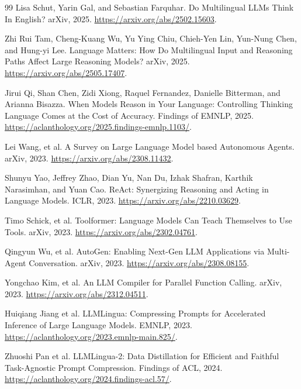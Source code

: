 \documentclass[11pt]{article}
\begin{document}
\begin{thebibliography}{99}
Lisa Schut, Yarin Gal, and Sebastian Farquhar.
\newblock Do Multilingual LLMs Think In English?
\newblock arXiv, 2025.
\newblock \url{https://arxiv.org/abs/2502.15603}.

Zhi Rui Tam, Cheng-Kuang Wu, Yu Ying Chiu, Chieh-Yen Lin, Yun-Nung Chen, and Hung-yi Lee.
\newblock Language Matters: How Do Multilingual Input and Reasoning Paths Affect Large Reasoning Models?
\newblock arXiv, 2025.
\newblock \url{https://arxiv.org/abs/2505.17407}.

Jirui Qi, Shan Chen, Zidi Xiong, Raquel Fernandez, Danielle Bitterman, and Arianna Bisazza.
\newblock When Models Reason in Your Language: Controlling Thinking Language Comes at the Cost of Accuracy.
\newblock Findings of EMNLP, 2025.
\newblock \url{https://aclanthology.org/2025.findings-emnlp.1103/}.

Lei Wang, et al.
\newblock A Survey on Large Language Model based Autonomous Agents.
\newblock arXiv, 2023.
\newblock \url{https://arxiv.org/abs/2308.11432}.

Shunyu Yao, Jeffrey Zhao, Dian Yu, Nan Du, Izhak Shafran, Karthik Narasimhan, and Yuan Cao.
\newblock ReAct: Synergizing Reasoning and Acting in Language Models.
\newblock ICLR, 2023.
\newblock \url{https://arxiv.org/abs/2210.03629}.

Timo Schick, et al.
\newblock Toolformer: Language Models Can Teach Themselves to Use Tools.
\newblock arXiv, 2023.
\newblock \url{https://arxiv.org/abs/2302.04761}.

Qingyun Wu, et al.
\newblock AutoGen: Enabling Next-Gen LLM Applications via Multi-Agent Conversation.
\newblock arXiv, 2023.
\newblock \url{https://arxiv.org/abs/2308.08155}.

Yongchao Kim, et al.
\newblock An LLM Compiler for Parallel Function Calling.
\newblock arXiv, 2023.
\newblock \url{https://arxiv.org/abs/2312.04511}.

Huiqiang Jiang et al.
\newblock LLMLingua: Compressing Prompts for Accelerated Inference of Large Language Models.
\newblock EMNLP, 2023.
\newblock \url{https://aclanthology.org/2023.emnlp-main.825/}.

Zhuoshi Pan et al.
\newblock LLMLingua-2: Data Distillation for Efficient and Faithful Task-Agnostic Prompt Compression.
\newblock Findings of ACL, 2024.
\newblock \url{https://aclanthology.org/2024.findings-acl.57/}.


\end{thebibliography}
\end{document}
